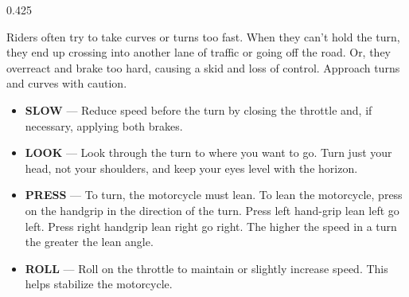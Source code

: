 \begin{langblock}{0.425}
	\begin{eng}
	Riders often try to take curves or turns too fast. When they can't hold the turn, they end up crossing into another lane of traffic or going off the road. Or, they overreact and brake too hard, causing a skid and loss of control. Approach turns and curves with caution.
	\begin{itemize}
		\item \textbf{SLOW} --- Reduce speed before the turn by closing the throttle and, if necessary, applying both brakes.
		\item \textbf{LOOK} --- Look through the turn to where you want to go. Turn just your head, not your shoulders, and keep your eyes level with the horizon.
		\item \textbf{PRESS} --- To turn, the motorcycle must lean. To lean the motorcycle, press on the handgrip in the direction of the turn. Press left hand-grip lean left go left. Press right handgrip lean right go right. The higher the speed in a turn the greater the lean angle.
		\item \textbf{ROLL} --- Roll on the throttle to maintain or slightly increase speed. This helps stabilize the motorcycle.
	\end{itemize}
	

\end{eng}
\end{langblock}
